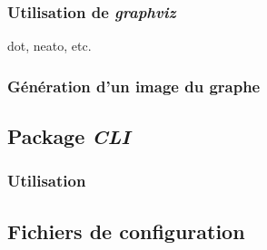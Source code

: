 \subsubsection{Utilisation de \emph{graphviz}}
dot, neato, etc.
\subsubsection{Génération d'un image du graphe}
\subsection{Package \emph{CLI}}
\subsubsection{Utilisation}
\subsection{Fichiers de configuration}